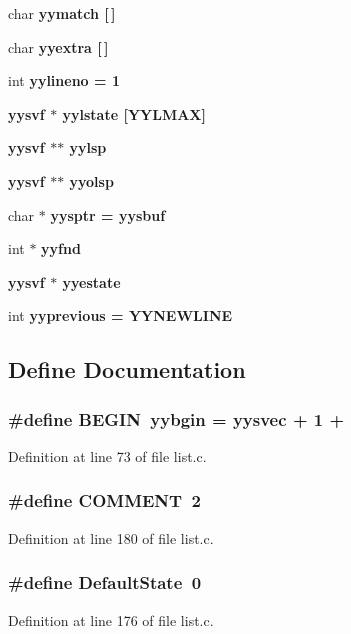 \begin{CompactItemize}
\item 
char \bf{yymatch} [$\,$]
\item 
char \bf{yyextra} [$\,$]
\item 
int \bf{yylineno} = 1
\item 
\bf{yysvf} $\ast$ \bf{yylstate} [YYLMAX]
\item 
\bf{yysvf} $\ast$$\ast$ \bf{yylsp}
\item 
\bf{yysvf} $\ast$$\ast$ \bf{yyolsp}
\item 
char $\ast$ \bf{yysptr} = \bf{yysbuf}
\item 
int $\ast$ \bf{yyfnd}
\item 
\bf{yysvf} $\ast$ \bf{yyestate}
\item 
int \bf{yyprevious} = YYNEWLINE
\end{CompactItemize}


\subsection{Define Documentation}
\subsubsection{\setlength{\rightskip}{0pt plus 5cm}\#define BEGIN~\bf{yybgin} = \bf{yysvec} + 1 +}\label{list_8c_b766bbbee08d04b67e3fe599d6900873}




Definition at line 73 of file list.c.
\subsubsection{\setlength{\rightskip}{0pt plus 5cm}\#define COMMENT~2}\label{list_8c_180f5b3835bdbfc11b353fd2af5c8659}




Definition at line 180 of file list.c.
\subsubsection{\setlength{\rightskip}{0pt plus 5cm}\#define Default\-State~0}\label{list_8c_9931e72b5f7e6382d2e7b0aaaf4a01fe}




Definition at line 176 of file list.c.
